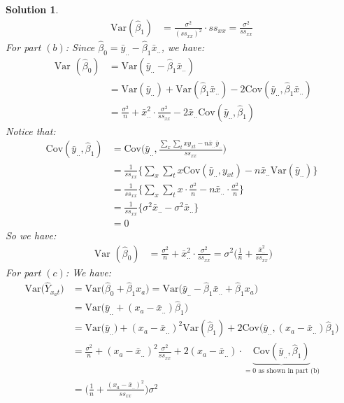 \documentclass[11pt]{article}
\newtheorem{sol}{Solution}
\begin{document}
\begin{sol}
\begin{align*}
	\text{Var}(\hat{\beta}_1) &= \frac{\sigma^2}{(ss_{xx})^2}\cdot ss_{xx} = \frac{\sigma^2}{ss_{xx}}
\end{align*}
For part $(b)$:\vskip 2mm
Since $\hat{\beta}_0 = \bar{y}_{..} - \hat{\beta}_1\bar{x}_{..}$, we have:
\begin{align*}
	\text{ Var }(\hat{\beta}_0) &= \text{Var}(\bar{y}_{..} - \hat{\beta}_1\bar{x}_{..})\\
	&= \text{Var}(\bar{y}_{..}) + \text{Var}(\hat{\beta}_1\bar{x}_{..}) - 2\text{Cov}(\bar{y}_{..}, \hat{\beta}_1\bar{x}_{..})\\
	&= \frac{\sigma^2}{n} + \bar{x}^2_{..}\cdot \frac{\sigma^2}{ss_{xx}} - 2\bar{x}_{..}\text{Cov}(\bar{y}_{..}, \hat{\beta}_1)
\end{align*}
Notice that:
\begin{align*}
	\text{Cov}(\bar{y}_{..}, \hat{\beta}_1) &= \text{Cov}\Big(\bar{y}_{..}, \frac{\sum_x\sum_t xy_{xt} - n\bar{x}_{..}\bar{y}_{..}}{ss_{xx}}\Big)\\
	&= \frac{1}{ss_{xx}}\Big\{\sum_x\sum_t x \text{Cov}(\bar{y}_{..}, y_{xt}) - n\bar{x}_{..}\text{Var}(\bar{y}_{..})\Big\}\\
	&= \frac{1}{ss_{xx}}\Big\{\sum_x\sum_t x\cdot \frac{\sigma^2}{n} - n\bar{x}_{..}\cdot \frac{\sigma^2}{n}\Big\}\\
	&= \frac{1}{ss_{xx}}\Big\{\sigma^2\bar{x}_{..} - \sigma^2\bar{x}_{..}\Big\}\\
	&= 0
\end{align*}
So we have:
\begin{align*}
	\text{ Var }(\hat{\beta}_0) &=  \frac{\sigma^2}{n} + \bar{x}^2_{..}\cdot \frac{\sigma^2}{ss_{xx}} = \sigma^2\Big(\frac{1}{n} + \frac{\bar{x}^2_{..}}{ss_{xx}}\Big)
\end{align*}
For part $(c)$:\vskip 2mm
We have:
\begin{align*}
	\text{Var}\Big(\hat{Y}_{x_{a}t}\Big) &= \text{Var}\Big(\hat{\beta}_0 + \hat{\beta}_1 x_a\Big) = \text{Var}\Big(\bar{y}_{..} - \hat{\beta}_1\bar{x}_{..} + \hat{\beta}_1x_a\Big)\\
	&= \text{Var}\Big(\bar{y}_{..} + (x_a - \bar{x}_{..})\hat{\beta}_1\Big)\\
	&= \text{Var}\Big(\bar{y}_{..}\Big) + (x_a - \bar{x}_{..})^2\text{Var}(\hat{\beta}_1) + 2\text{Cov}\Big(\bar{y}_{..}, (x_a - \bar{x}_{..})\hat{\beta}_1\Big)\\
	&= \frac{\sigma^2}{n} + (x_a - \bar{x}_{..})^2\frac{\sigma^2}{ss_{xx}} + 2(x_a - \bar{x}_{..})\cdot\underbrace{\text{Cov}(\bar{y}_{..}, \hat{\beta}_1)}_{ = 0 \text{ as shown in part (b)}}\\
	&= \Big(\frac{1}{n} + \frac{(x_a - \bar{x}_{..})^2}{ss_{xx}}\Big)\sigma^2
\end{align*}
\end{sol}
\end{document}
